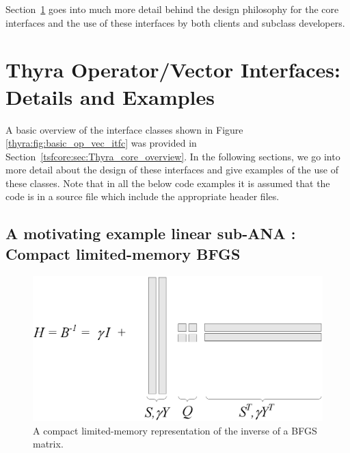 \documentclass[pdf,ps2pdf,11pt]{SANDreport}
\begin{document}
Section~\ref{tsfcore:sec:Thyra_Details} goes into much more detail behind the
design philosophy for the core interfaces and the use of these interfaces by
both clients and subclass developers.

%
\section{Thyra Operator/Vector Interfaces: Details and Examples}
\label{tsfcore:sec:Thyra_Details}
%

A basic overview of the interface classes shown in Figure
{}\ref{thyra:fig:basic_op_vec_itfc} was provided in
Section~\ref{tsfcore:sec:Thyra_core_overview}.  In the following sections, we
go into more detail about the design of these interfaces and give examples of
the use of these classes.  Note that in all the below code examples it is
assumed that the code is in a source file which include the appropriate header
files.

%
\subsection{A motivating example linear sub-ANA : Compact limited-memory BFGS}
\label{tsfcore:sec:LBFGS}
%

{\bsinglespace
\begin{figure}[t]
\begin{center}
\includegraphics*[angle=0,scale=0.60]{LBFGS}
\end{center}
\caption{
\label{tsfcore:fig:LBFGS}
A compact limited-memory representation of the inverse of a BFGS matrix.
}
\end{figure}
\esinglespace}
\end{document}
